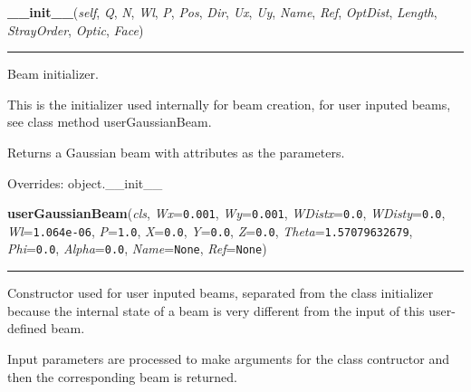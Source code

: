     \vspace{0.5ex}

\hspace{.8\funcindent}\begin{boxedminipage}{\funcwidth}

    \raggedright \textbf{\_\_init\_\_}(\textit{self}, \textit{Q}, \textit{N}, \textit{Wl}, \textit{P}, \textit{Pos}, \textit{Dir}, \textit{Ux}, \textit{Uy}, \textit{Name}, \textit{Ref}, \textit{OptDist}, \textit{Length}, \textit{StrayOrder}, \textit{Optic}, \textit{Face})

    \vspace{-1.5ex}

    \rule{\textwidth}{0.5\fboxrule}
\setlength{\parskip}{2ex}
    Beam initializer.

    This is the initializer used internally for beam creation, for user 
    inputed beams, see class method userGaussianBeam.

    Returns a Gaussian beam with attributes as the parameters.

\setlength{\parskip}{1ex}
      Overrides: object.\_\_init\_\_

    \end{boxedminipage}

    \label{theia:optics:beam:GaussianBeam:userGaussianBeam}

    \vspace{0.5ex}

\hspace{.8\funcindent}\begin{boxedminipage}{\funcwidth}

    \raggedright \textbf{userGaussianBeam}(\textit{cls}, \textit{Wx}={\tt 0.001}, \textit{Wy}={\tt 0.001}, \textit{WDistx}={\tt 0.0}, \textit{WDisty}={\tt 0.0}, \textit{Wl}={\tt 1.064e-06}, \textit{P}={\tt 1.0}, \textit{X}={\tt 0.0}, \textit{Y}={\tt 0.0}, \textit{Z}={\tt 0.0}, \textit{Theta}={\tt 1.57079632679}, \textit{Phi}={\tt 0.0}, \textit{Alpha}={\tt 0.0}, \textit{Name}={\tt None}, \textit{Ref}={\tt None})

    \vspace{-1.5ex}

    \rule{\textwidth}{0.5\fboxrule}
\setlength{\parskip}{2ex}
    Constructor used for user inputed beams, separated from the class 
    initializer because the internal state of a beam is very different from
    the input of this user-defined beam.

    Input parameters are processed to make arguments for the class 
    contructor and then the corresponding beam is returned.

\setlength{\parskip}{1ex}
    \end{boxedminipage}

